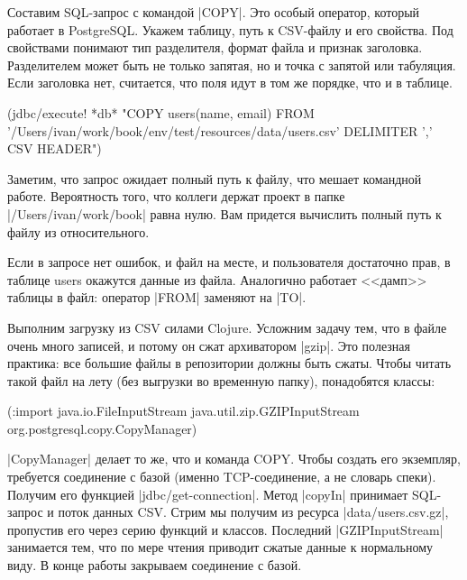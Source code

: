 Составим SQL-запрос с командой \spverb|COPY|. Это особый оператор, который
работает в PostgreSQL. Укажем таблицу, путь к CSV-файлу и его свойства. Под
свойствами понимают тип разделителя, формат файла и признак
заголовка. Разделителем может быть не только запятая, но и точка с запятой или
табуляция. Если заголовка нет, считается, что поля идут в том же порядке, что и
в таблице.

\begin{english}
  \begin{clojure}
(jdbc/execute! *db*
 "COPY users(name, email)
  FROM '/Users/ivan/work/book/env/test/resources/data/users.csv'
  DELIMITER ',' CSV HEADER")
  \end{clojure}
\end{english}

Заметим, что запрос ожидает полный путь к файлу, что мешает командной
работе. Вероятность того, что коллеги держат проект в папке
\spverb|/Users/ivan/work/book| равна нулю. Вам придется вычислить полный путь к
файлу из относительного.

Если в запросе нет ошибок, и файл на месте, и пользователя достаточно прав, в
таблице users окажутся данные из файла. Аналогично работает <<дамп>> таблицы в
файл: оператор \spverb|FROM| заменяют на \spverb|TO|.

Выполним загрузку из CSV силами Clojure. Усложним задачу тем, что в файле очень
много записей, и потому он сжат архиватором \spverb|gzip|. Это полезная
практика: все большие файлы в репозитории должны быть сжаты. Чтобы читать такой
файл на лету (без выгрузки во временную папку), понадобятся классы:

\begin{english}
  \begin{clojure}
(:import java.io.FileInputStream
         java.util.zip.GZIPInputStream
         org.postgresql.copy.CopyManager)
  \end{clojure}
\end{english}

\spverb|CopyManager| делает то же, что и команда COPY. Чтобы создать его
экземпляр, требуется соединение с базой (именно TCP-соединение, а не словарь
спеки). Получим его функцией \spverb|jdbc/get-connection|. Метод \spverb|copyIn|
принимает SQL-запрос и поток данных CSV. Стрим мы получим из ресурса
\spverb|data/users.csv.gz|, пропустив его через серию функций и
классов. Последний \spverb|GZIPInputStream| занимается тем, что по мере чтения
приводит сжатые данные к нормальному виду. В конце работы закрываем соединение с
базой.

